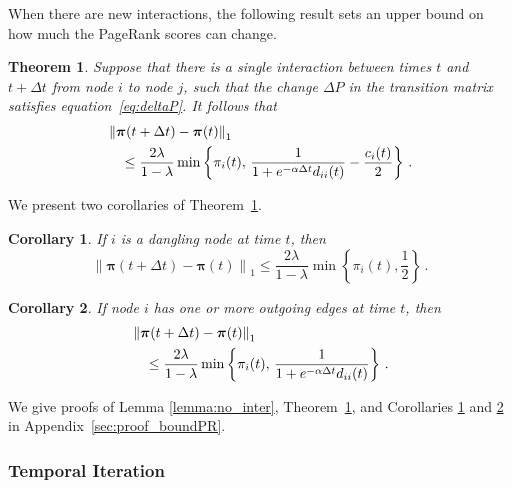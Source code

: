 \documentclass[journal,transmag]{IEEEtran}
\newtheorem{theorem}{Theorem}
\newtheorem{corollary}{Corollary}
\newcommand{\gvec}[1]{\bm{#1}}
\newcommand{\norm}[1]{\left\| #1 \right\|}
\newcommand{\tdt}{t+\Delta t}
\newcommand{\dP}{\Delta P}
\newcommand{\vpi}{\gvec{\pi}}
\begin{document}
When there are new interactions, the following result sets an upper
bound on how much the PageRank scores can change.
\begin{theorem}
\label{thm:boundPR}
Suppose that there is a single interaction between times $t$ and
$\tdt$ from node $i$ to node $j$, such that the change $\dP$ in the
transition matrix satisfies equation~\eqref{eq:deltaP}. 
It follows that
\begin{align}
	  &\norm{\vpi(\tdt) - \vpi(t)}_1  \notag \\
	&\quad   \leq \frac{2\lambda}{1-\lambda} \min
  \left\lbrace \pi_{i}(t), \, \frac{1}{1+e^{-\alpha \Delta
      t}d_{ii}(t)} - \frac{c_i(t)}{2} \right\rbrace\,.
  \label{eq:combinedprmax}
\end{align}
\end{theorem}

We present two corollaries of Theorem~\ref{thm:boundPR}. 
\begin{corollary}
If $i$ is a dangling node at time $t$, then
\begin{equation}
	  \norm{\vpi(\tdt) - \vpi(t)}_1 
  \leq \frac{2\lambda}{1-\lambda} \min 
  \left\lbrace \pi_{i}(t), \frac{1}{2} \right\rbrace\,.
\end{equation}
\label{corr:dangling}
\end{corollary}


\begin{corollary}
If node $i$ has one or more outgoing edges at time $t$, then
\begin{align}
	  &\norm{\vpi(\tdt) - \vpi(t)}_1 \notag \\
  &\quad \leq \frac{2\lambda}{1-\lambda} \min 
  \left\lbrace \pi_{i}(t), \, 
    \frac{1}{1+e^{-\alpha \Delta t}d_{ii}(t)} \right\rbrace\,.
\end{align}
\label{corr:notdangling}
\end{corollary}

We give proofs of Lemma \ref{lemma:no_inter},
Theorem~\ref{thm:boundPR}, and Corollaries \ref{corr:dangling} and
\ref{corr:notdangling} in Appendix~\ref{sec:proof_boundPR}.


\subsubsection{Temporal Iteration}
\end{document}
